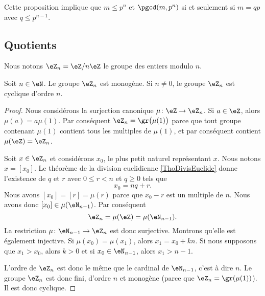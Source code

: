 Cette proposition implique que \( m\leq p^n\) et \( \pgcd(m,p^n)\) si et seulement si \( m=qp\) avec \( q\leq p^{n-1}\).

\subsection{Quotients}

Nous notons \( \eZ_n=\eZ/n\eZ\) le groupe des entiers modulo \( n\).

\begin{proposition}
    Soit \( n\in\eN\). Le groupe \( \eZ_n\) est monogène. Si \( n\neq 0\), le groupe \( \eZ_n\) est cyclique d'ordre \( n\).
\end{proposition}

\begin{proof}
    Nous considérons la surjection canonique \( \mu\colon \eZ\to \eZ_n\). Si \( a\in\eZ\), alors \( \mu(a)=a\mu(1)\). Par conséquent \( \eZ_n=\gr\big( \mu(1) \big)\) parce que tout groupe contenant \( \mu(1)\) contient tous les multiples de \( \mu(1)\), et par conséquent contient \( \mu(\eZ)=\eZ_n\).

    Soit \( x\in\eZ_n\) et considérons \( x_0\), le plus petit naturel représentant \( x\). Nous notons \( x=[x_0]\). Le théorème de la division euclidienne \ref{ThoDivisEuclide} donne l'existence de \( q\) et \( r\) avec \( 0\leq r<n\) et \( q\geq 0\) tels que
    \begin{equation}
        x_0=nq+r.
    \end{equation}
    Nous avons \( [x_0]=[r]=\mu(r)\) parce que \( x_0-r\) est un multiple de \( n\). Nous avons donc \( [x_0]\in\mu(\eN_{n-1})\). Par conséquent
    \begin{equation}
        \eZ_n=\mu(\eZ)=\mu(\eN_{n-1}).
    \end{equation}
    La restriction \( \mu\colon \eN_{n-1}\to \eZ_n\) est donc surjective. Montrons qu'elle est également injective. Si \( \mu(x_0)=\mu(x_1)\), alors \( x_1=x_0+kn\). Si nous supposons que \( x_1>x_0\), alors \( k>0\) et si \( x_0\in\eN_{n-1}\), alors \( x_1>n-1\).

    L'ordre de \( \eZ_n\) est donc le même que le cardinal de \( \eN_{n-1}\), c'est à dire \( n\). Le groupe \( \eZ_n\) est donc fini, d'ordre \( n\) et monogène (parce que \( \eZ_n=\gr(\mu(1))\)). Il est donc cyclique.
\end{proof}
 
